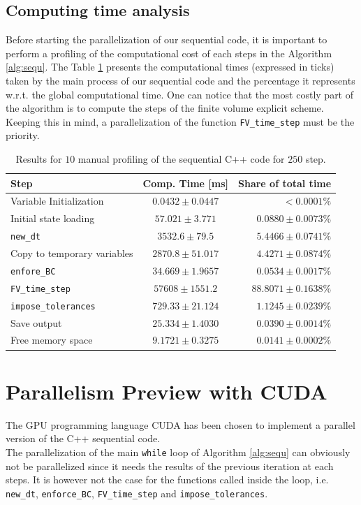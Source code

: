 \documentclass{article}
\begin{document}
\subsection{Computing time analysis}
Before starting the parallelization of our sequential code, it is important to perform a profiling of the computational cost of each steps in the Algorithm \ref{alg:sequ}. The Table \ref{tab:manual_sequ_profiling} presents the computational times (expressed in ticks) taken by the main process of our sequential code and the percentage it represents w.r.t. the global computational time. One can notice that the most costly part of the algorithm is to compute the steps of the finite volume explicit scheme. Keeping this in mind, a parallelization of the function \texttt{FV\_time\_step} must be the priority.
\begin{table}[h!]
	\centering
\begin{tabular}{l|c|r}
	Step & Comp. Time [ms] & Share of total time \\
	\hline 
	Variable Initialization 	& $0.0432	\pm	0.0447$ & $<0.0001\%$ \\ 
	Initial state loading 		& $57.021	\pm	3.771$ 	& $0.0880	\pm	0.0073\%$ \\ 
	\texttt{new\_dt} 			& $3532.6	\pm	79.5$ 	& $5.4466	\pm	0.0741\%$ \\ 
	Copy to temporary variables & $2870.8	\pm	51.017$ & $4.4271	\pm	0.0874\%$ \\ 
	\texttt{enfore\_BC} 		& $34.669	\pm	1.9657$ & $0.0534	\pm	0.0017\%$ \\ 
	\texttt{FV\_time\_step} 	& $57608	\pm	1551.2$ & $88.8071	\pm	0.1638\%$ \\ 
	\texttt{impose\_tolerances} & $729.33	\pm	21.124$ & $1.1245	\pm	0.0239\%$ \\ 
	Save output 				& $25.334	\pm	1.4030$	& $0.0390	\pm 0.0014\%$ \\ 
	Free memory space 			& $9.1721	\pm	0.3275$ & $0.0141	\pm 0.0002\%$\\
	\hline
\end{tabular} 
\caption{Results for $10$ manual profiling of the sequential C++ code for $250$ step.}
\label{tab:manual_sequ_profiling}
\end{table}

\section{Parallelism Preview with CUDA}
The GPU programming language CUDA has been chosen to implement a parallel version of the C++ sequential code.\\The parallelization of the main \texttt{while} loop of Algorithm \ref{alg:sequ} can obviously not be parallelized since it needs the results of the previous iteration at each steps. It is however not the case for the functions called inside the loop, i.e. \texttt{new\_dt}, \texttt{enforce\_BC}, \texttt{FV\_time\_step} and \texttt{impose\_tolerances}. 
\end{document}
